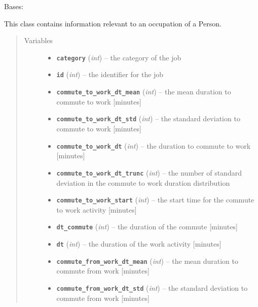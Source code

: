 \documentclass[letterpaper,10pt,english]{sphinxmanual}
\begin{document}
\begin{fulllineitems}
\label{occupation:occupation.Occupation}
Bases: 

This class contains information relevant to an occupation of a Person.
\begin{quote}\begin{description}
\item[{Variables}] \leavevmode\begin{itemize}
\item {} 
\textbf{\texttt{category}} (\emph{int}) -- the category of the job

\item {} 
\textbf{\texttt{id}} (\emph{int}) -- the identifier for the job

\item {} 
\textbf{\texttt{commute\_to\_work\_dt\_mean}} (\emph{int}) -- the mean duration to commute to work {[}minutes{]}

\item {} 
\textbf{\texttt{commute\_to\_work\_dt\_std}} (\emph{int}) -- the standard deviation to commute to work {[}minutes{]}

\item {} 
\textbf{\texttt{commute\_to\_work\_dt}} (\emph{int}) -- the duration to commute to work {[}minutes{]}

\item {} 
\textbf{\texttt{commute\_to\_work\_dt\_trunc}} (\emph{int}) -- the number of standard deviation in the commute to work     duration distribution

\item {} 
\textbf{\texttt{commute\_to\_work\_start}} (\emph{int}) -- the start time for the commute to work activity {[}minutes{]}

\item {} 
\textbf{\texttt{dt\_commute}} (\emph{int}) -- the duration of the commute {[}minutes{]}

\item {} 
\textbf{\texttt{dt}} (\emph{int}) -- the duration of the work activity {[}minutes{]}

\item {} 
\textbf{\texttt{commute\_from\_work\_dt\_mean}} (\emph{int}) -- the mean duration to commute from work {[}minutes{]}

\item {} 
\textbf{\texttt{commute\_from\_work\_dt\_std}} (\emph{int}) -- the standard deviation to commute from work {[}minutes{]}


\end{itemize}
\end{description}
\end{quote}
\end{fulllineitems}
\end{document}
